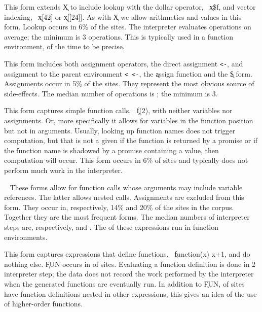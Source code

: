 \documentclass[review,screen,acmsmall,anonymous=true]{acmart}
\begin{document}
\medskip\noindent{} This form extends \c X to include lookup
with the dollar operator, \eg~\c{x\$f}, and vector indexing, \eg~\c{x[42]} or
\c{x[[24]]}. As with \c X we allow arithmetics and values in this form. Lookup
occurs in 6\% of the sites. The interpreter evaluates
\packageMinimizedmedianoperationsgRnd operations on average; the minimum is 3
operations. This is typically used in a function environment,
\packageMinimizedpercentparentframese of the time to be precise.

\medskip\noindent{} This form includes both assignment
operators, the direct assignment {\tt <-}, and assignment to the parent
environment {\tt <\,\!<-}, the \c{assign} function and the \c{\$} form. Assignments occur in 5\% of the
sites. They represent the most obvious source of side-effects. The median number
of operations is \packageMinimizedmedianoperationsiRnd; the minimum is 3.

\medskip\noindent{} This form captures simple function calls,
\eg~\c{f(2)}, with neither variables nor assignments. Or, more specifically it
allows for variables in the function position but not in arguments. Usually,
looking up function names does not trigger computation, but that is not a given
if the function is returned by a promise or if the function name is shadowed by
a promise containing a value, then computation will occur. This form occurs in
6\% of sites and typically does not perform much work in the interpreter.

\medskip\noindent{}~ These
forms allow for function calls whose arguments may include variable references.
The latter allows nested calls. Assignments are excluded from this form. They
occur in, respectively, 14\% and 20\% of the sites in the corpus. Together they
are the most frequent forms. The median numbers of interpreter steps are,
respectively, \packageMinimizedmedianoperationsdRnd and
\packageMinimizedmedianoperationsbRnd. The \packageMinimizedpercentparentframesj
of these expressions run in function environments.

\medskip\noindent{} This form captures expressions that define functions, \eg~\c{function(x) x+1}, and do nothing else. \c{FUN} occurs in
\packageFunctionDefinitionSitesPercent of sites. Evaluating a function
definition is done in 2 interpreter step; the data does not record the work
performed by the interpreter when the generated functions are eventually run. In
addition to \c{FUN}, \packageGeneralizedFunctionDefinitionSitesPercent of sites
have function definitions nested in other expressions, this gives an idea of the
use of higher-order functions.
\end{document}
